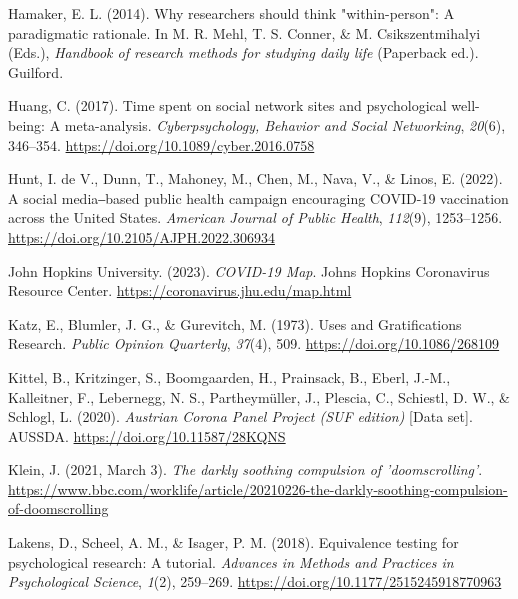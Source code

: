 \documentclass[
  man,mask,floatsintext]{apa7}
\newlength{\cslhangindent}
\newlength{\cslentryspacingunit} %
\newenvironment{CSLReferences}[2] %
 {%
  \setlength{\parindent}{0pt}
  \ifodd #1
  \let\oldpar\par
  \def\par{\hangindent=\cslhangindent\oldpar}
  \fi
  \setlength{\parskip}{#2\cslentryspacingunit}
 }%
 {}
\begin{document}
\begin{CSLReferences}{1}{0}
\leavevmode{}%
Hamaker, E. L. (2014). Why researchers should think "within-person": {A} paradigmatic rationale. In M. R. Mehl, T. S. Conner, \& M. Csikszentmihalyi (Eds.), \emph{Handbook of research methods for studying daily life} (Paperback ed.). {Guilford}.

\leavevmode{}%
Huang, C. (2017). Time spent on social network sites and psychological well-being: {A} meta-analysis. \emph{Cyberpsychology, Behavior and Social Networking}, \emph{20}(6), 346--354. \url{https://doi.org/10.1089/cyber.2016.0758}

\leavevmode{}%
Hunt, I. de V., Dunn, T., Mahoney, M., Chen, M., Nava, V., \& Linos, E. (2022). A social media‒based public health campaign encouraging {COVID-19} vaccination across the {United States}. \emph{American Journal of Public Health}, \emph{112}(9), 1253--1256. \url{https://doi.org/10.2105/AJPH.2022.306934}

\leavevmode{}%
John Hopkins University. (2023). \emph{{COVID-19 Map}}. {Johns Hopkins Coronavirus Resource Center}. \url{https://coronavirus.jhu.edu/map.html}

\leavevmode{}%
Katz, E., Blumler, J. G., \& Gurevitch, M. (1973). Uses and {Gratifications Research}. \emph{Public Opinion Quarterly}, \emph{37}(4), 509. \url{https://doi.org/10.1086/268109}

\leavevmode{}%
Kittel, B., Kritzinger, S., Boomgaarden, H., Prainsack, B., Eberl, J.-M., Kalleitner, F., Lebernegg, N. S., Partheymüller, J., Plescia, C., Schiestl, D. W., \& Schlogl, L. (2020). \emph{Austrian {Corona Panel Project} ({SUF} edition)} {[}Data set{]}. {AUSSDA}. \url{https://doi.org/10.11587/28KQNS}

\leavevmode{}%
Klein, J. (2021, March 3). \emph{The darkly soothing compulsion of 'doomscrolling'}. \url{https://www.bbc.com/worklife/article/20210226-the-darkly-soothing-compulsion-of-doomscrolling}

\leavevmode{}%
Lakens, D., Scheel, A. M., \& Isager, P. M. (2018). Equivalence testing for psychological research: {A} tutorial. \emph{Advances in Methods and Practices in Psychological Science}, \emph{1}(2), 259--269. \url{https://doi.org/10.1177/2515245918770963}


\end{CSLReferences}
\end{document}
